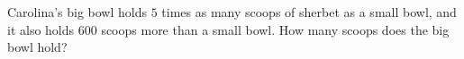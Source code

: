 Carolina's big bowl holds $5$ times as many scoops of sherbet as a small bowl, and it also holds $600$ scoops more than a small bowl. How many scoops does the big bowl hold?
